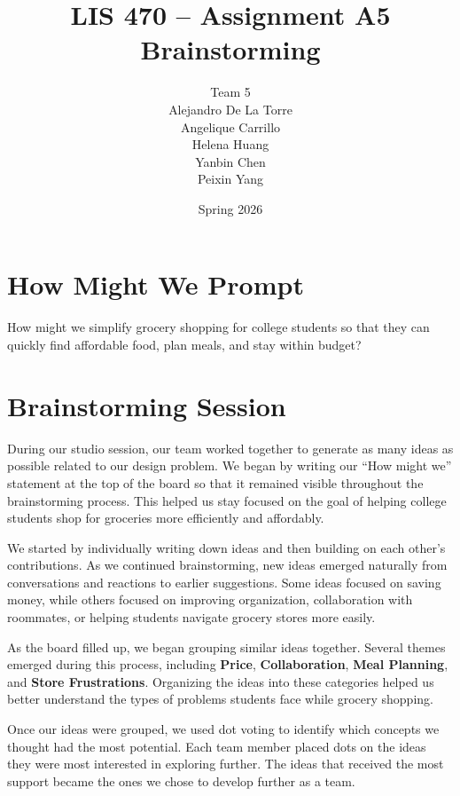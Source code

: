\documentclass[11pt]{article}
\title{LIS 470 -- Assignment A5 \\
Brainstorming}
\author{Team 5 \\
Alejandro De La Torre \\
Angelique Carrillo \\
Helena Huang \\
Yanbin Chen \\
Peixin Yang}
\date{Spring 2026}
\begin{document}
\maketitle

\vspace{1cm}

\section*{How Might We Prompt}

How might we simplify grocery shopping for college students so that they can quickly find affordable food, plan meals, and stay within budget?

\vspace{0.5cm}

\section*{Brainstorming Session}

During our studio session, our team worked together to generate as many ideas as possible related to our design problem. We began by writing our “How might we” statement at the top of the board so that it remained visible throughout the brainstorming process. This helped us stay focused on the goal of helping college students shop for groceries more efficiently and affordably.

We started by individually writing down ideas and then building on each other’s contributions. As we continued brainstorming, new ideas emerged naturally from conversations and reactions to earlier suggestions. Some ideas focused on saving money, while others focused on improving organization, collaboration with roommates, or helping students navigate grocery stores more easily.

As the board filled up, we began grouping similar ideas together. Several themes emerged during this process, including \textbf{Price}, \textbf{Collaboration}, \textbf{Meal Planning}, and \textbf{Store Frustrations}. Organizing the ideas into these categories helped us better understand the types of problems students face while grocery shopping.

Once our ideas were grouped, we used dot voting to identify which concepts we thought had the most potential. Each team member placed dots on the ideas they were most interested in exploring further. The ideas that received the most support became the ones we chose to develop further as a team.
\end{document}
